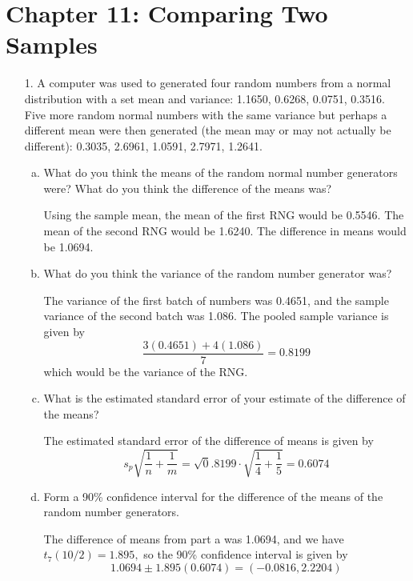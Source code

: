 \documentclass{article}
\begin{document}
\section*{Chapter 11: Comparing Two Samples}

\begin{itemize}
	\item[1.] A computer was used to generated four random numbers from a normal distribution with a set mean and variance: 1.1650, 0.6268, 0.0751, 0.3516. Five more random normal numbers with the same variance but perhaps a different mean were then generated (the mean may or may not actually be different): 0.3035, 2.6961, 1.0591, 2.7971, 1.2641.
		\begin{enumerate}[a.]
			\item What do you think the means of the random normal number generators were? What do you think the difference of the means was?
				\begin{soln}
					Using the sample mean, the mean of the first RNG would be 0.5546. The mean of the second RNG would be 1.6240. The difference in means would be 1.0694.
				\end{soln}

			\item What do you think the variance of the random number generator was?
				\begin{soln}
					The variance of the first batch of numbers was 0.4651, and the sample variance of the second batch was 1.086. The pooled sample variance is given by \[\frac{3(0.4651) + 4(1.086)}{7} = 0.8199\] which would be the variance of the RNG.
				\end{soln}

			\item What is the estimated standard error of your estimate of the difference of the means?
				\begin{soln}
					The estimated standard error of the difference of means is given by \[s_p\sqrt{\frac{1}{n}+\frac{1}{m}} = \sqrt0.8199\cdot\sqrt{\frac{1}{4} + \frac{1}{5}} = 0.6074\]
				\end{soln}

			\item Form a 90\% confidence interval for the difference of the means of the random number generators.
				\begin{soln}
					The difference of means from part a was 1.0694, and we have $t_7(10/2)=1.895,$ so the 90\% confidence interval is given by \[1.0694\pm 1.895(0.6074)= (-0.0816, 2.2204)\]
				\end{soln}


\end{enumerate}
\end{itemize}
\end{document}
